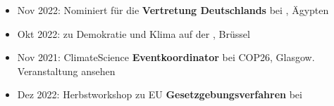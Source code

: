 \documentclass[10pt,a4paper,ragged2e,withhyper]{altacv}
\begin{document}
\begin{paracol}{2}
\begin{itemize}
    \item Nov 2022: Nominiert für die \textbf{Vertretung Deutschlands} bei , Ägypten
    \item Okt 2022:  zu Demokratie und Klima auf der  , Brüssel
    \item Nov 2021: ClimateScience \textbf{Eventkoordinator} bei COP26, Glasgow. Veranstaltung  ansehen
\end{itemize}

\begin{itemize}
    \item Dez 2022: Herbstworkshop zu EU \textbf{Gesetzgebungsverfahren} bei 
\end{itemize}

\newpage





\end{paracol}
\end{document}
